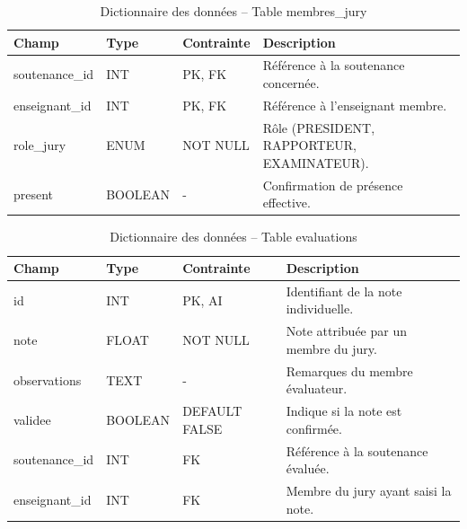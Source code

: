 \documentclass[12pt,a4paper]{article}
\begin{document}
\begin{table}[H]
    \centering
    \small
    \begin{tabular}{lp{2cm}lp{6cm}}
        \toprule
        \rowcolor{primary!10}
        \textbf{Champ} & \textbf{Type} & \textbf{Contrainte} & \textbf{Description}                       \\
        \midrule
        soutenance\_id & INT           & PK, FK              & Référence à la soutenance concernée.       \\
        enseignant\_id & INT           & PK, FK              & Référence à l'enseignant membre.           \\
        role\_jury     & ENUM          & NOT NULL            & Rôle (PRESIDENT, RAPPORTEUR, EXAMINATEUR). \\
        present        & BOOLEAN       & -                   & Confirmation de présence effective.        \\
        \bottomrule
    \end{tabular}
    \caption{Dictionnaire des données -- Table membres\_jury}
\end{table}

\begin{table}[H]
    \centering
    \small
    \begin{tabular}{lp{2cm}lp{6cm}}
        \toprule
        \rowcolor{primary!10}
        \textbf{Champ} & \textbf{Type} & \textbf{Contrainte} & \textbf{Description}                      \\
        \midrule
        id             & INT           & PK, AI              & Identifiant de la note individuelle.      \\
        note           & FLOAT         & NOT NULL            & Note attribuée par un membre du jury.     \\
        observations   & TEXT          & -                   & Remarques du membre évaluateur.           \\
        validee        & BOOLEAN       & DEFAULT FALSE       & Indique si la note est confirmée.         \\
        soutenance\_id & INT           & FK                  & Référence à la soutenance évaluée.        \\
        enseignant\_id & INT           & FK                  & Membre du jury ayant saisi la note.       \\
        \bottomrule
    \end{tabular}
    \caption{Dictionnaire des données -- Table evaluations}
\end{table}
\end{document}
